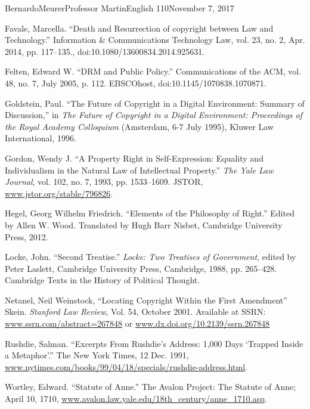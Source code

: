 \documentclass[12pt,letterpaper]{article}
\begin{document}
\begin{mla}{Bernardo}{Meurer}{Professor Martin}{English 110}{November 7, 2017}
        \begin{workscited}
            \bibent
            Favale, Marcella. ``Death and Resurrection of copyright between Law and Technology.'' Information \& Communications Technology Law, vol. 23, no. 2, Apr. 2014, pp. 117–135., doi:10.1080/13600834.2014.925631.

            \bibent
            Felten, Edward W. ``DRM and Public Policy.'' Communications of the ACM, vol. 48, no. 7, July 2005, p. 112. EBSCOhost, doi:10.1145/1070838.1070871.

            \bibent
            \bibent
            Goldstein, Paul. ``The Future of Copyright in a Digital Environment: Summary of Discussion,'' in \textit{The Future of Copyright in a Digital Environment: Proceedings of the Royal Academy Colloquium} (Amsterdam, 6-7 July 1995), Kluwer Law International, 1996.

            \bibent
            Gordon, Wendy J. ``A Property Right in Self-Expression: Equality and Individualism in the Natural Law of Intellectual Property.'' \textit{The Yale Law Journal}, vol. 102, no. 7, 1993, pp. 1533–1609. JSTOR, \url{www.jstor.org/stable/796826}.

            \bibent
            Hegel, Georg Wilhelm Friedrich. ``Elements of the Philosophy of Right.'' Edited by Allen W. Wood. Translated by Hugh Barr Nisbet, Cambridge University Press, 2012.

            \bibent
            Locke, John. ``Second Treatise.'' \textit{Locke: Two Treatises of Government}, edited by Peter Laslett, Cambridge University Press, Cambridge, 1988, pp. 265–428. Cambridge Texts in the History of Political Thought.

            \bibent
            Netanel, Neil Weinstock, ``Locating Copyright Within the First Amendment'' Skein. \textit{Stanford Law Review}, Vol. 54, October 2001. Available at SSRN: \url{www.ssrn.com/abstract=267848} or \url{www.dx.doi.org/10.2139/ssrn.267848}

            \bibent
            Rushdie, Salman. ``Excerpts From Rushdie's Address: 1,000 Days `Trapped Inside a Metaphor'.'' The New York Times, 12 Dec. 1991, \url{www.nytimes.com/books/99/04/18/specials/rushdie-address.html}.

            \bibent
            Wortley, Edward. ``Statute of Anne.'' The Avalon Project: The Statute of Anne; April 10, 1710, \url{www.avalon.law.yale.edu/18th_century/anne_1710.asp}.
        \end{workscited}
    \end{mla}
    
\end{document}
